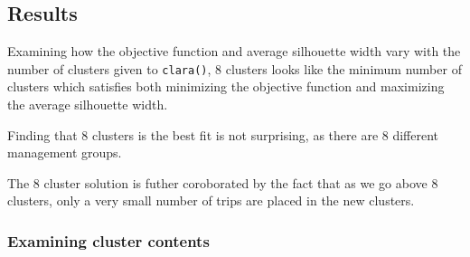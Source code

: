 \documentclass[]{article}
\begin{document}
\subsection{Results}\label{results}

Examining how the objective function and average silhouette width vary
with the number of clusters given to \texttt{clara()}, 8 clusters looks
like the minimum number of clusters which satisfies both minimizing the
objective function and maximizing the average silhouette width.

Finding that 8 clusters is the best fit is not surprising, as there are
8 different management groups.

The 8 cluster solution is futher coroborated by the fact that as we go
above 8 clusters, only a very small number of trips are placed in the
new clusters.

\subsubsection{Examining cluster
contents}\label{examining-cluster-contents}
\end{document}
